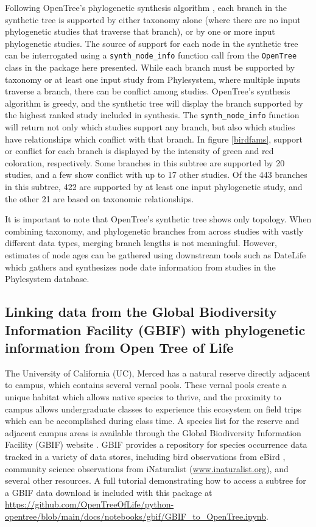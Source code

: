 \documentclass[oupdraft]{sysbio_sse}
\begin{document}
Following OpenTree's phylogenetic synthesis algorithm \citep{redelings_supertree_2017}, each branch in the synthetic tree is supported
by either taxonomy alone (where there are no input phylogenetic studies that traverse that branch), or by one or more input phylogenetic studies.
The source of support for each node in the synthetic tree can be interrogated using a \texttt{synth\_node\_info} function call from the \texttt{OpenTree} class in the package here presented.
While each branch must be supported by taxonomy or at least one input study from Phylesystem, where multiple inputs traverse a branch, there can be conflict among studies.
OpenTree's synthesis algorithm is greedy, and the synthetic tree will display the branch supported by the highest ranked study included in synthesis.
The \texttt{synth\_node\_info} function will return not only which studies support any branch, but also which studies have relationships which conflict with that branch.
In figure \ref{birdfams}, support or conflict for each branch is displayed by the intensity of green and red coloration, respectively. Some branches in this subtree are supported by 20 studies, and a few show conflict with up to 17 other studies. Of the 443 branches in this subtree, 422 are supported by at least one input phylogenetic study, and the other 21 are based on taxonomic relationships.

It is important to note that OpenTree's synthetic tree shows only topology. When combining taxonomy, and phylogenetic branches from across studies with vastly different data types, merging branch lengths is not meaningful. However, estimates of node ages can be gathered using downstream tools such as DateLife \citep{sanchez-reyes_datelife_2019} which gathers and synthesizes node date information from studies in the Phylesystem database.

\subsection{Linking data from the Global Biodiversity Information Facility (GBIF) with phylogenetic information from Open Tree of Life}

\bigskip

The University of California (UC), Merced has a natural reserve directly adjacent to campus, which contains several vernal pools. These vernal pools create a unique habitat which allows native species to thrive, and the proximity to campus allows undergraduate classes to experience this ecosystem on field trips which can be accomplished during class time.
A species list for the reserve and adjacent campus areas is available through the Global Biodiversity Information Facility (GBIF) website \citep{gbif_secretariat_gbif_2019}. GBIF provides a repository for species occurrence data tracked in a variety of data stores, including bird observations from eBird \citep{sullivan_ebird_2009}, community science observations from iNaturalist (\url{www.inaturalist.org}), and several other resources. A full tutorial demonstrating how to access a subtree for a GBIF data download is included with this package at \url{https://github.com/OpenTreeOfLife/python-opentree/blob/main/docs/notebooks/gbif/GBIF_to_OpenTree.ipynb}.
\end{document}
